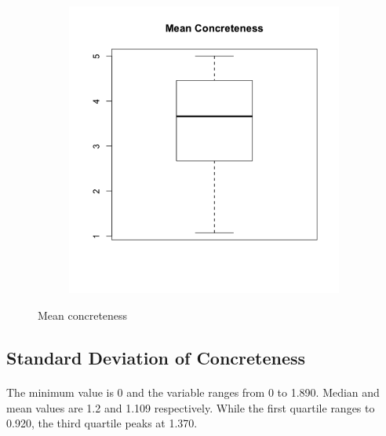 \documentclass[11pt,a4paper]{article}
\begin{document}
\begin{figure}[H]
\begin{subfigure}[b]{0.4\linewidth}
  \end{subfigure}
  \begin{subfigure}[b]{0.4\linewidth}
    \includegraphics[width=\linewidth]{images/box_concm.png}
  \end{subfigure}
  \caption{Mean concreteness}
  \label{fig:concm}
\end{figure}



\subsection{Standard Deviation of Concreteness}
\paragraph{}
The minimum value is 0 and the variable ranges from 0 to 1.890. Median and mean values are 1.2 and 1.109 respectively. While the first quartile ranges to 0.920, the third quartile peaks at 1.370.
\end{document}
